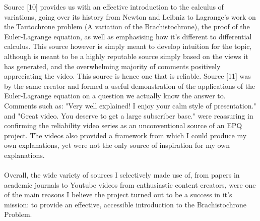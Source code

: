 \documentclass[12pt]{report}
\begin{document}
\begin{itemize}
    Source [10] provides us with an effective introduction to the calculus of variations, going over its history from Newton and Leibniz to Lagrange's work on the Tautochrone problem (A variation of the Brachistochrone), the proof of the Euler-Lagrange equation, as well as emphasising how it's different to differential calculus. This source however is simply meant to develop intuition for the topic, although is meant to be a highly reputable source simply based on the views it has generated, and the overwhelming majority of comments positively appreciating the video. This source is hence one that is reliable. Source [11] was by the same creator and formed a useful demonstration of the applications of the Euler-Lagrange equation on a question we actually know the answer to. Comments such as: "Very well explained! I enjoy your calm style of presentation." and "Great video. You deserve to get a large subscriber base." were reassuring in confirming the reliability video series as an unconventional source of an EPQ project. The videos also provided a framework from which I could produce my own explanations, yet were not the only source of inspiration for my own explanations.
    \\
    \\
    Overall, the wide variety of sources I selectively made use of, from papers in academic journals to Youtube videos from enthusiastic content creators, were one of the main reasons I believe the project turned out to be a success in it's mission: to provide an effective, accessible introduction to the Brachistochrone Problem. 
    
\end{itemize}
\end{document}
